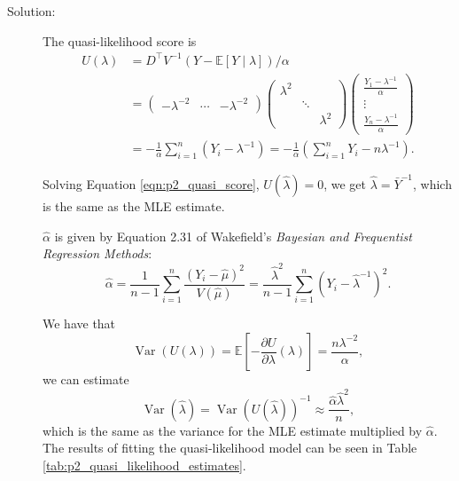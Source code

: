 \documentclass[letterpaper,11pt]{article}
\begin{document}
\begin{enumerate}
\begin{enumerate}
      \begin{description}
      \item[Solution:] The quasi-likelihood score is
        \begin{align}
          U\left(\lambda\right)
          &= D^\intercal V^{-1}
            \left(Y - \mathbb{E}\left[Y \mid \lambda \right]\right)/\alpha \nonumber\\
          &= \begin{pmatrix}
            -\lambda^{-2} & \cdots & -\lambda^{-2}
          \end{pmatrix} \begin{pmatrix}
            \lambda^{2} & & \\
            & \ddots & \\
            & & \lambda^{2}
          \end{pmatrix} \begin{pmatrix}
            \frac{Y_1 - \lambda^{-1}}{\alpha} \\
            \vdots \\
            \frac{Y_n - \lambda^{-1}}{\alpha}
          \end{pmatrix} \nonumber\\
          &= -\frac{1}{\alpha}\sum_{i=1}^n\left(Y_i - \lambda^{-1}\right)
            = -\frac{1}{\alpha}\left(\sum_{i=1}^nY_i - n\lambda^{-1}\right).
            \label{eqn:p2_quasi_score}
        \end{align}
        
        Solving Equation \ref{eqn:p2_quasi_score},
        $U\left(\hat{\lambda}\right) = 0$, we get
        $\hat{\lambda} = \bar{Y}^{-1}$, which is the same as the MLE estimate.

        $\hat{\alpha}$ is given by Equation 2.31 of Wakefield's \emph{Bayesian
          and Frequentist Regression Methods}:
        \begin{equation}
          \hat{\alpha}
          = \frac{1}{n - 1}\sum_{i=1}^n\frac{\left(Y_i - \hat{\mu}\right)^2}{V\left(\hat{\mu}\right)}
          = \frac{\hat{\lambda}^2}{n - 1}\sum_{i=1}^n\left(Y_i - \hat{\lambda}^{-1}\right)^2.
        \end{equation}

        We have that
        \begin{equation}
          \operatorname{Var}\left(U\left(\lambda\right)\right)
          = \mathbb{E}\left[- \frac{\partial U}{\partial \lambda}(\lambda)\right]
          = \frac{n\lambda^{-2}}{\alpha},
        \end{equation}
        we can estimate
        \begin{equation}
          \operatorname{Var}\left(\hat{\lambda}\right) =
          \operatorname{Var}\left(U\left(\hat{\lambda}\right)\right)^{-1}
          \approx \frac{\hat{\alpha}\hat{\lambda}^2}{n},
        \end{equation}
        which is the same as the variance for the MLE estimate multiplied by
        $\hat{\alpha}$. The results of fitting the quasi-likelihood model can be
        seen in Table \ref{tab:p2_quasi_likelihood_estimates}.


\end{description}
\end{enumerate}
\end{enumerate}
\end{document}
